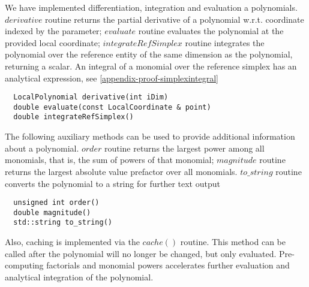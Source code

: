 \noindent
We have implemented differentiation, integration and evaluation a polynomials. $derivative$ routine returns the partial derivative of a polynomial w.r.t. coordinate indexed by the parameter; $evaluate$ routine evaluates the polynomial at the provided local coordinate; $integrateRefSimplex$ routine integrates the polynomial over the reference entity of the same dimension as the polynomial, returning a scalar. An integral of a monomial over the reference simplex has an analytical expression, see \ref{appendix-proof-simplexintegral} \\


\begin{mybox}
\begin{lstlisting}
  LocalPolynomial derivative(int iDim)
  double evaluate(const LocalCoordinate & point)
  double integrateRefSimplex()
\end{lstlisting}
\end{mybox}


\noindent
The following auxiliary methods can be used to provide additional information about a polynomial. $order$ routine returns the largest power among all monomials, that is, the sum of powers of that monomial;
$magnitude$ routine returns the largest absolute value prefactor over all monomials. $to\_string$ routine converts the polynomial to a string for further text output \\

\begin{mybox}
\begin{lstlisting}
  unsigned int order()
  double magnitude()
  std::string to_string()
\end{lstlisting}
\end{mybox}

\noindent
Also, caching is implemented via the $cache()$ routine. This method can be called after the polynomial will no longer be changed, but only evaluated. Pre-computing factorials and monomial powers accelerates further evaluation and analytical integration of the polynomial.





